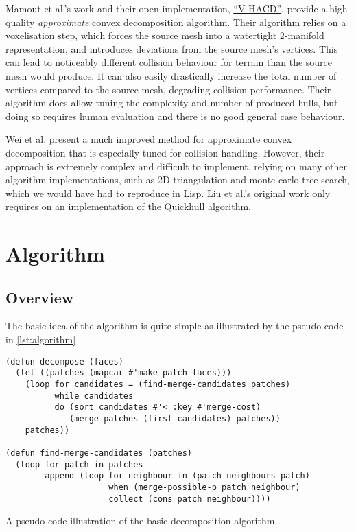 \documentclass[format=sigconf]{acmart}
\begin{document}
Mamout et al.\cite{mamou2016volumetric}'s work and their open implementation, \href{https://github.com/kmammou/v-hacd}{``V-HACD''}, provide a high-quality \textit{approximate} convex decomposition algorithm. Their algorithm relies on a voxelisation step, which forces the source mesh into a watertight 2-manifold representation, and introduces deviations from the source mesh's vertices. This can lead to noticeably different collision behaviour for terrain than the source mesh would produce. It can also easily drastically increase the total number of vertices compared to the source mesh, degrading collision performance. Their algorithm does allow tuning the complexity and number of produced hulls, but doing so requires human evaluation and there is no good general case behaviour.

Wei et al.\cite{wei2022coacd} present a much improved method for approximate convex decomposition that is especially tuned for collision handling. However, their approach is extremely complex and difficult to implement, relying on many other algorithm implementations, such as 2D triangulation and monte-carlo tree search, which we would have had to reproduce in Lisp. Liu et al.'s original work only requires on an implementation of the Quickhull\cite{barber1996quickhull} algorithm.

\section{Algorithm}\label{algorithm}
\subsection{Overview}
The basic idea of the algorithm is quite simple as illustrated by the pseudo-code in \autoref{lst:algorithm}

\begin{listing}[h]
\begin{verbatim}
(defun decompose (faces)
  (let ((patches (mapcar #'make-patch faces)))
    (loop for candidates = (find-merge-candidates patches)
          while candidates
          do (sort candidates #'< :key #'merge-cost)
             (merge-patches (first candidates) patches))
    patches))

(defun find-merge-candidates (patches)
  (loop for patch in patches
        append (loop for neighbour in (patch-neighbours patch)
                     when (merge-possible-p patch neighbour)
                     collect (cons patch neighbour))))
\end{verbatim}
\caption{A pseudo-code illustration of the basic decomposition algorithm}
\label{lst:algorithm}
\end{listing}
\end{document}
